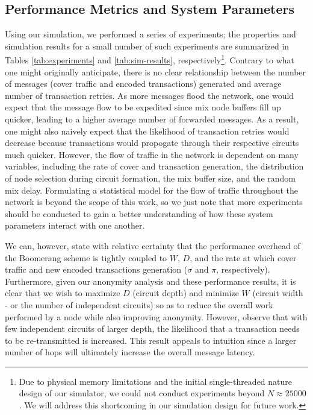 \subsection{Performance Metrics and System Parameters}
Using our simulation, we performed a series of experiments; the properties and simulation results for a small number of such experiments are summarized in Tables \ref{tab:experiments} and \ref{tab:sim-results}, respectively\footnote{Due to physical memory limitations and the initial single-threaded nature design of our simulator, we could not conduct experiments beyond $N \approx 25000$. We will address this shortcoming in our simulation design for future work.}. Contrary to what one might originally anticipate, there is no clear relationship between the number of messages (cover traffic and encoded transactions) generated and average number of transaction retries. As more messages flood the network, one would expect that the message flow to be expedited since mix node buffers fill up quicker, leading to a higher average number of forwarded messages. As a result, one might also naively expect that the likelihood of transaction retries would decrease because transactions would propogate through their respective circuits much quicker. However, the flow of traffic in the network is dependent on many variables, including the rate of cover and transaction generation, the distribution of node selection during circuit formation, the mix buffer size, and the random mix delay. Formulating a statistical model for the flow of traffic throughout the network is beyond the scope of this work, so we just note that more experiments should be conducted to gain a better understanding of how these system parameters interact with one another. 

We can, however, state with relative certainty that the performance overhead of the Boomerang scheme is tightly coupled to $W$, $D$, and the rate at which cover traffic and new encoded transactions generation ($\sigma$ and $\pi$, respectively). Furthermore, given our anonymity analysis and these performance results, it is clear that we wish to maximize $D$ (circuit depth) and minimize $W$ (circuit width - or the number of independent circuits) so as to reduce the overall work performed by a node while also improving anonymity. However, observe that with few independent circuits of larger depth, the likelihood that a transaction needs to be re-transmitted is increased. This result appeals to intuition since a larger number of hops will ultimately increase the overall message latency.

